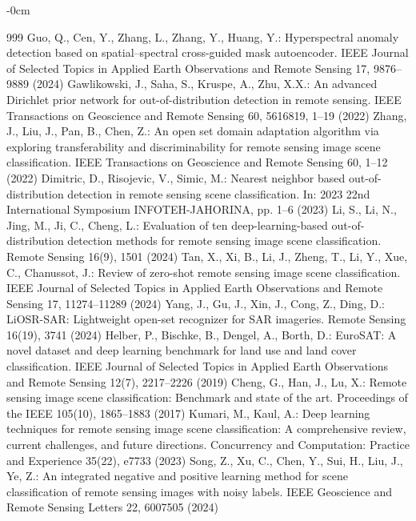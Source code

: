 \documentclass[remotesensing,article,submit,pdftex,moreauthors]{Definitions/mdpi}
\begin{document}
\begin{adjustwidth}{-\extralength}{0cm}
\begin{thebibliography}{999}
Guo, Q., Cen, Y., Zhang, L., Zhang, Y., Huang, Y.: Hyperspectral anomaly detection based on spatial--spectral cross-guided mask autoencoder. IEEE Journal of Selected Topics in Applied Earth Observations and Remote Sensing 17, 9876--9889 (2024)
Gawlikowski, J., Saha, S., Kruspe, A., Zhu, X.X.: An advanced Dirichlet prior network for out-of-distribution detection in remote sensing. IEEE Transactions on Geoscience and Remote Sensing 60, 5616819, 1--19 (2022)
Zhang, J., Liu, J., Pan, B., Chen, Z.: An open set domain adaptation algorithm via exploring transferability and discriminability for remote sensing image scene classification. IEEE Transactions on Geoscience and Remote Sensing 60, 1--12 (2022)
Dimitric, D., Risojevic, V., Simic, M.: Nearest neighbor based out-of-distribution detection in remote sensing scene classification. In: 2023 22nd International Symposium INFOTEH-JAHORINA, pp. 1--6 (2023)
Li, S., Li, N., Jing, M., Ji, C., Cheng, L.: Evaluation of ten deep-learning-based out-of-distribution detection methods for remote sensing image scene classification. Remote Sensing 16(9), 1501 (2024)
Tan, X., Xi, B., Li, J., Zheng, T., Li, Y., Xue, C., Chanussot, J.: Review of zero-shot remote sensing image scene classification. IEEE Journal of Selected Topics in Applied Earth Observations and Remote Sensing 17, 11274--11289 (2024)
Yang, J., Gu, J., Xin, J., Cong, Z., Ding, D.: LiOSR-SAR: Lightweight open-set recognizer for SAR imageries. Remote Sensing 16(19), 3741 (2024)
Helber, P., Bischke, B., Dengel, A., Borth, D.: EuroSAT: A novel dataset and deep learning benchmark for land use and land cover classification. IEEE Journal of Selected Topics in Applied Earth Observations and Remote Sensing 12(7), 2217--2226 (2019)
Cheng, G., Han, J., Lu, X.: Remote sensing image scene classification: Benchmark and state of the art. Proceedings of the IEEE 105(10), 1865--1883 (2017)
Kumari, M., Kaul, A.: Deep learning techniques for remote sensing image scene classification: A comprehensive review, current challenges, and future directions. Concurrency and Computation: Practice and Experience 35(22), e7733 (2023)
Song, Z., Xu, C., Chen, Y., Sui, H., Liu, J., Ye, Z.: An integrated negative and positive learning method for scene classification of remote sensing images with noisy labels. IEEE Geoscience and Remote Sensing Letters 22, 6007505 (2024)

\end{thebibliography}
\end{adjustwidth}
\end{document}
